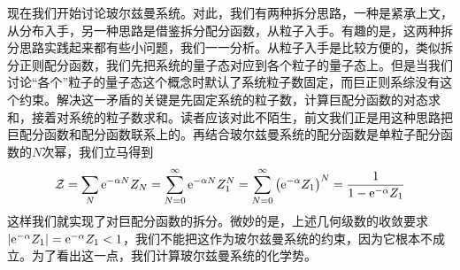 \documentclass[../../main.tex]{subfiles}
\begin{document}
现在我们开始讨论玻尔兹曼系统。对此，我们有两种拆分思路，一种是紧承上文，从分布入手，另一种思路是借鉴拆分配分函数，从粒子入手。有趣的是，这两种拆分思路实践起来都有些小问题，我们一一分析。从粒子入手是比较方便的，类似拆分正则配分函数，我们先把系统的量子态对应到各个粒子的量子态上。但是当我们讨论“各个”粒子的量子态这个概念时默认了系统粒子数固定，而巨正则系综没有这个约束。解决这一矛盾的关键是先固定系统的粒子数，计算巨配分函数的对态求和，接着对系统的粒子数求和。读者应该对此不陌生，前文我们正是用这种思路把巨配分函数和配分函数联系上的。再结合玻尔兹曼系统的配分函数是单粒子配分函数的\(N\)次幂，我们立马得到
\begin{equation}
    \mathcal{Z}=\sum_N \mathrm{e}^{-\alpha N}Z_N=\sum_{N=0}^{\infty} \mathrm{e}^{-\alpha N}Z_1^N=\sum_{N=0}^{\infty} \big(\mathrm{e}^{-\alpha}Z_1\big)^N=\frac{1}{1-\mathrm{e}^{-\alpha}Z_1}
\end{equation}
这样我们就实现了对巨配分函数的拆分。微妙的是，上述几何级数的收敛要求\(\abs{\mathrm{e}^{-\alpha}Z_1}=\mathrm{e}^{-\alpha}Z_1<1\)，我们不能把这作为玻尔兹曼系统的约束，因为它根本不成立。为了看出这一点，我们计算玻尔兹曼系统的化学势。
\end{document}
